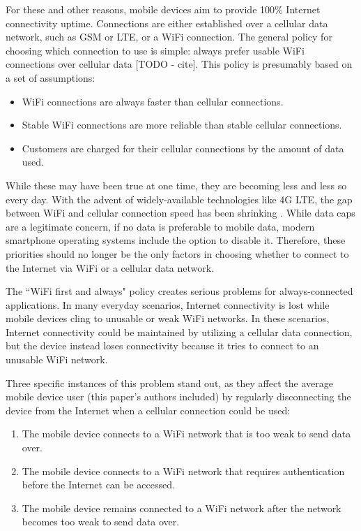 For these and other reasons, mobile devices aim to provide 100\% Internet connectivity uptime. Connections are either established over a cellular data network, such as GSM or LTE, or a WiFi connection. The general policy for choosing which connection to use is simple: always prefer usable WiFi connections over cellular data [TODO - cite]. This policy is presumably based on a set of assumptions:

\begin{itemize}
\item WiFi connections are always faster than cellular connections.
\item Stable WiFi connections are more reliable than stable cellular connections.
\item Customers are charged for their cellular connections by the amount of data used.
\end{itemize}

While these may have been true at one time, they are becoming less and less so every day. With the advent of widely-available technologies like 4G LTE, the gap between WiFi and cellular connection speed has been shrinking \cite{Huang:2012:CEP:2307636.2307658}. While data caps are a legitimate concern, if no data is preferable to mobile data, modern smartphone operating systems include the option to disable it. Therefore, these priorities should no longer be the only factors in choosing whether to connect to the Internet via WiFi or a cellular data network.

The ``WiFi first and always" policy creates serious problems for always-connected applications. In many everyday scenarios, Internet connectivity is lost while mobile devices cling to unusable or weak WiFi networks. In these scenarios, Internet connectivity could be maintained by utilizing a cellular data connection, but the device instead loses connectivity because it tries to connect to an unusable WiFi network.

Three specific instances of this problem stand out, as they affect the average mobile device user (this paper's authors included) by regularly disconnecting the device from the Internet when a cellular connection could be used:

\begin{enumerate}
\item The mobile device connects to a WiFi network that is too weak to send data over.
\item The mobile device connects to a WiFi network that requires authentication before the Internet can be accessed.
\item The mobile device remains connected to a WiFi network after the network becomes too weak to send data over.
\end{enumerate}

